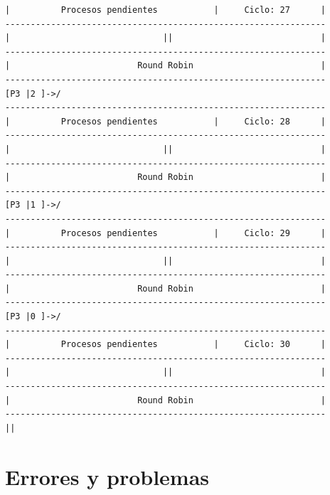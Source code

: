 \documentclass[12pt]{article}
\begin{document}
\begin{verbatim}
|          Procesos pendientes           |     Ciclo: 27      |
---------------------------------------------------------------
|                              ||                             |
---------------------------------------------------------------
|                         Round Robin                         |
---------------------------------------------------------------
[P3 |2 ]->/
---------------------------------------------------------------
|          Procesos pendientes           |     Ciclo: 28      |
---------------------------------------------------------------
|                              ||                             |
---------------------------------------------------------------
|                         Round Robin                         |
---------------------------------------------------------------
[P3 |1 ]->/
---------------------------------------------------------------
|          Procesos pendientes           |     Ciclo: 29      |
---------------------------------------------------------------
|                              ||                             |
---------------------------------------------------------------
|                         Round Robin                         |
---------------------------------------------------------------
[P3 |0 ]->/
---------------------------------------------------------------
|          Procesos pendientes           |     Ciclo: 30      |
---------------------------------------------------------------
|                              ||                             |
---------------------------------------------------------------
|                         Round Robin                         |
---------------------------------------------------------------
||
\end{verbatim}
\section{Errores y problemas}
\end{document}
